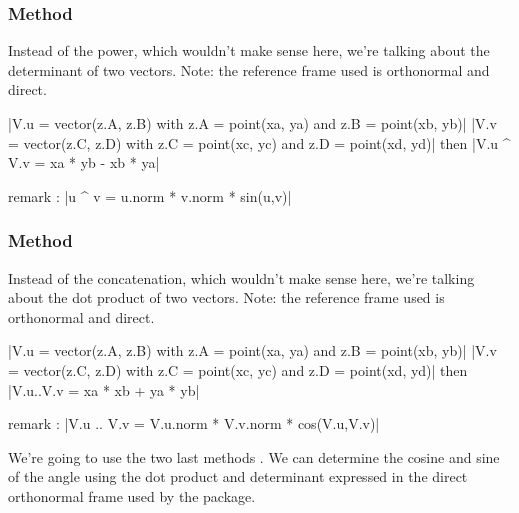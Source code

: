 \subsubsection{Method }
\label{ssub:method_vector_det}
Instead of the power, which wouldn't make sense here, we're talking about the determinant of two vectors. Note: the reference frame used is orthonormal and direct.

\begin{mybox}
|V.u = vector(z.A, z.B) with z.A = point(xa, ya) and z.B = point(xb, yb)|
|V.v = vector(z.C, z.D) with z.C = point(xc, yc) and z.D = point(xd, yd)|
then |V.u ^ V.v = xa * yb -  xb * ya|
\end{mybox}

remark : |u ^ v = u.norm * v.norm * sin(u,v)|

\subsubsection{Method }
\label{ssub:method_vector_dot}
Instead of the concatenation, which wouldn't make sense here, we're talking about the dot product of two vectors. Note: the reference frame used is orthonormal and direct.

\begin{mybox}
|V.u = vector(z.A, z.B) with z.A = point(xa, ya) and z.B = point(xb, yb)|
|V.v = vector(z.C, z.D) with z.C = point(xc, yc) and z.D = point(xd, yd)|
then |V.u..V.v = xa * xb +  ya * yb|
\end{mybox}

remark : |V.u .. V.v = V.u.norm * V.v.norm * cos(V.u,V.v)|


We're going to use the two last methods . We can determine the cosine and sine of the angle using the dot product and determinant expressed in the direct orthonormal frame used by the package.

